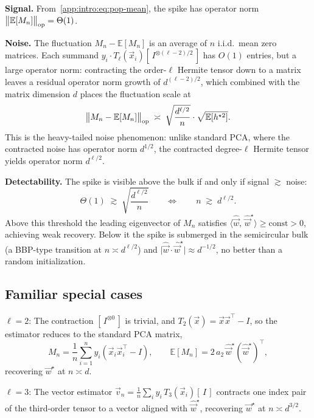 \medskip\noindent\textbf{Signal.} From~\eqref{app:intro:eq:pop-mean}, the spike has operator norm \(\left\lVert \mathbb{E}[M_n]\right\rVert_\mathrm{op} = \Theta(1)\).

\medskip\noindent\textbf{Noise.} The fluctuation \(M_n - \mathbb{E}[M_n]\) is an average of \(n\) i.i.d.\ mean zero matrices. Each summand \(y_i\cdot T_\ell(\vec{x}_i)[\,I^{\otimes(\ell-2)/2}\,]\) has \(O(1)\) entries, but a large operator norm: contracting the order-\(\ell\) Hermite tensor down to a matrix leaves a residual operator norm growth of \(d^{(\ell-2)/2}\), which combined with the matrix dimension \(d\) places the fluctuation scale at
\[
    \left\lVert M_n - \mathbb{E}[M_n]\right\rVert_\mathrm{op} \;\asymp\; \sqrt{\frac{d^{\ell/2}}{n}}\cdot\sqrt{\mathbb{E}[h^{\star 2}]}.
\]
This is the heavy-tailed noise phenomenon: unlike standard PCA, where the contracted noise has operator norm \(d^{1/2}\), the contracted degree-\(\ell\) Hermite tensor yields operator norm \(d^{\ell/2}\).

\medskip\noindent\textbf{Detectability.} The spike is visible above the bulk if and only if signal \(\gtrsim\) noise:
\begin{equation}\label{app:intro:eq:bbp}
    \Theta(1) \;\gtrsim\; \sqrt{\frac{d^{\ell/2}}{n}} \qquad\Longleftrightarrow\qquad \boxed{n \;\gtrsim\; d^{\ell/2}.}
\end{equation}
Above this threshold the leading eigenvector of \(M_n\) satisfies \(\langle \hat{\vec{w}},\,\hat{\vec{w}}^\star\rangle \geq \mathrm{const} > 0\), achieving weak recovery. Below it the spike is submerged in the semicircular bulk (a BBP-type transition at \(n \asymp d^{\ell/2}\)) and \(\lvert\hat{\vec{w}}\cdot\hat{\vec{w}}^\star\rvert \approx d^{-1/2}\), no better than a random initialization.

\subsection{Familiar special cases}

\(\ell = 2\): The contraction \([\,I^{\otimes 0}\,]\) is trivial, and \(T_2(\vec{x}) = \vec{x}\vec{x}^\top - I\), so the estimator reduces to the standard PCA matrix,
\[
    M_n = \frac{1}{n}\sum_{i=1}^n y_i\!\left(\vec{x}_i\vec{x}_i^\top - I\right), \qquad \mathbb{E}[M_n] = 2\,a_2\,\hat{\vec{w}}^\star(\hat{\vec{w}}^\star)^\top,
\]
recovering \(\vec{w}^\star\) at \(n \asymp d\).

\(\ell = 3\): The vector estimator \(\vec{v}_n = \frac{1}{n}\sum_i y_i\,T_3(\vec{x}_i)[\,I\,]\) contracts one index pair of the third-order tensor to a vector aligned with \(\hat{\vec{w}}^\star\), recovering \(\vec{w}^\star\) at \(n \asymp d^{3/2}\).
